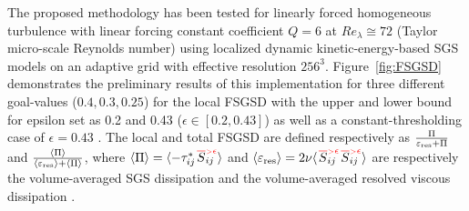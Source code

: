 The proposed methodology has been tested for linearly forced homogeneous turbulence \cite{JFM_2010}
with linear forcing constant coefficient $Q=6$
at $Re_{\lambda}\cong72$ (Taylor micro-scale Reynolds number)
using localized dynamic kinetic-energy-based SGS models \cite{POF_2008,JFM_2010}
on an adaptive grid with effective resolution $256^3$.
%
Figure~\ref{fig:FSGSD} demonstrates the preliminary results of this implementation
for three different goal-values ($0.4, 0.3, 0.25$) for the local FSGSD with
the upper and lower bound for epsilon set as 0.2 and 0.43 ($\epsilon \in [0.2,0.43]$)
as well as a constant-thresholding case of  $\epsilon=0.43$ .
%
The local and total FSGSD are defined respectively as
$
\frac{                            \Pi }
       {  \varepsilon_{\rm res}  +  \Pi }
$
and
$
  \frac{                                         \langle \Pi \rangle }
       { \langle \varepsilon_{\rm res} \rangle + \langle \Pi \rangle }
$,
where
$\langle \Pi \rangle = \langle -\tau^*_{ij}
                                {{\left.\red\overline{\bl S}_{\bl ij} \rule{-8pt}{6pt}\right.}^{\red {\scriptscriptstyle >} \epsilon}}
                       \rangle$
and
$\langle \varepsilon_{\rm res} \rangle = 2 \nu \langle
                                                {{\left.\red\overline{\bl S}_{\bl ij} \rule{-8pt}{6pt}\right.}^{\red {\scriptscriptstyle >} \epsilon}}
                                                {{\left.\red\overline{\bl S}_{\bl ij} \rule{-8pt}{6pt}\right.}^{\red {\scriptscriptstyle >} \epsilon}}
                                               \rangle$
are respectively  the volume-averaged SGS dissipation and the volume-averaged resolved viscous dissipation .


